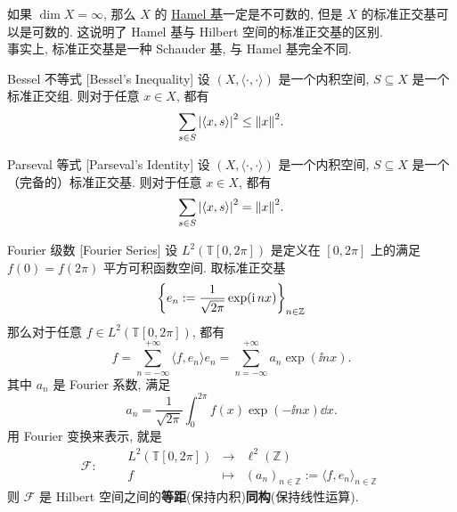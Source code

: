         \begin{rmk}
            [Dedicatia]
            如果 \(\dim X=\infty\), 那么 \(X\) 的 \hyperref[dfn:hamel-basis]{Hamel 基}一定是不可数的, 但是 \(X\) 的标准正交基可以是可数的. 这说明了 Hamel 基与 Hilbert 空间的标准正交基的区别.\\
            事实上, 标准正交基是一种 Schauder 基, 与 Hamel 基完全不同. 
        \end{rmk}

        \begin{thm}
            [bessel]
            {Bessel 不等式}
            [Bessel's Inequality]
            设 \((X, \langle\cdot,\cdot\rangle)\) 是一个内积空间, \(S\subseteq X\) 是一个标准正交组. 则对于任意 \(x\in X\), 都有
            \[\sum_{s\in S} \abs{\langle x,s\rangle}^2\leq\norm{x}^2.\]
        \end{thm}

        \begin{thm}
            [parseval]
            {Parseval 等式}
            [Parseval's Identity]
            设 \((X, \langle\cdot,\cdot\rangle)\) 是一个内积空间, \(S\subseteq X\) 是一个（完备的）标准正交基. 则对于任意 \(x\in X\), 都有
            \[\sum_{s\in S} \abs{\langle x,s\rangle}^2=\norm{x}^2.\]
        \end{thm}

        \begin{ins}
            {Fourier 级数}
            [Fourier Series]
            设 \(L^2(\mathbb{T}[0,2\pi])\) 是定义在 \([0,2\pi]\) 上的满足 \(f(0)=f(2\pi)\) 平方可积函数空间. 取标准正交基
            \[\qty{e_n:=\frac{1}{\sqrt{2\pi}}\exp(\operatorname{\mathrm{i}}nx)}_{n\in\mathbb{Z}}\]
            那么对于任意 \(f\in L^2(\mathbb{T}[0,2\pi])\), 都有
            \[f=\sum_{n=-\infty}^{+\infty} \langle f, e_n\rangle e_n= \sum_{n=-\infty}^{+\infty} a_n \exp(\ii nx).\]
            其中 \(a_n\) 是 Fourier 系数, 满足
            \[a_n=\frac{1}{\sqrt{2\pi}}\int_0^{2\pi} f(x)\exp(-\ii nx) \dd x.\]
            用 Fourier 变换来表示, 就是
            \[\mathscr{F}:\qquad\begin{matrix}
                L^2(\mathbb{T}[0,2\pi]) & \to & \ell^2(\mathbb{Z}) \\
                f & \mapsto & (a_n)_{n\in\mathbb{Z}}:=\langle f, e_n\rangle_{n\in\mathbb{Z}}
            \end{matrix}\]
            则 \(\mathscr{F}\) 是 Hilbert 空间之间的\textbf{等距}(保持内积)\textbf{同构}(保持线性运算).
        \end{ins}

